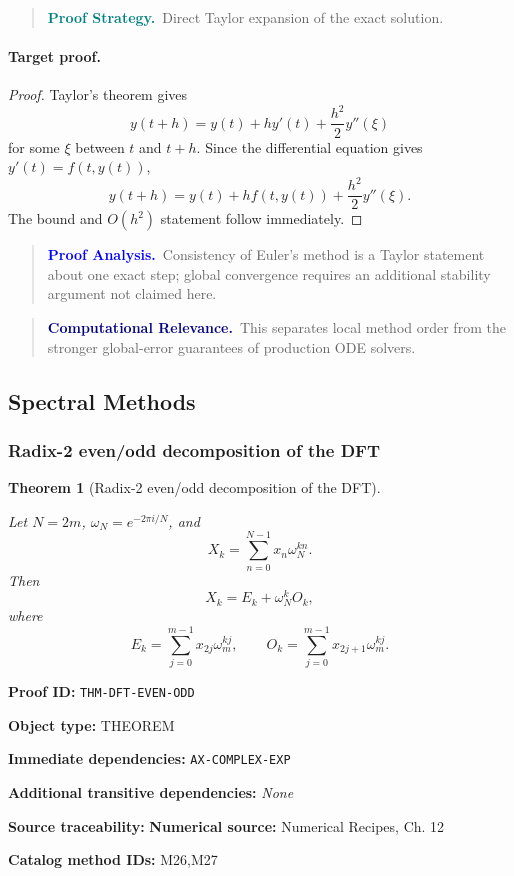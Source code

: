 \documentclass[10pt]{article}
\newcommand{\pidraw}[1]{\begingroup\urlstyle{tt}\nolinkurl{#1}\endgroup}
\newtheorem{theorem}{Theorem}[section]
\theoremstyle{definition}
\theoremstyle{remark}
\newenvironment{proofstrategy}
{\begin{quote}\small\noindent\textbf{\textcolor{teal}{Proof Strategy.}}\ }
{\end{quote}}
\newenvironment{proofanalysis}
{\begin{quote}\small\noindent\textbf{\textcolor{blue}{Proof Analysis.}}\ }
{\end{quote}}
\newenvironment{computationalrelevance}
{\begin{quote}\small\noindent\textbf{\textcolor{navy}{Computational Relevance.}}\ }
{\end{quote}}
\newcommand{\meta}[2]{\noindent\textbf{#1:} #2\par}
\begin{document}
\begin{proofstrategy}Direct Taylor expansion of the exact solution.\end{proofstrategy}

\paragraph{Target proof.}

\begin{proof}

Taylor's theorem gives
\[
y(t+h)=y(t)+hy'(t)+\frac{h^2}{2}y''(\xi)
\]
for some $\xi$ between $t$ and $t+h$. Since the differential equation gives
$y'(t)=f(t,y(t))$,
\[
y(t+h)=y(t)+h f(t,y(t))+\frac{h^2}{2}y''(\xi).
\]
The bound and $O(h^2)$ statement follow immediately.

\end{proof}

\begin{proofanalysis}Consistency of Euler's method is a Taylor statement about one exact step; global convergence requires an additional stability argument not claimed here.\end{proofanalysis}

\begin{computationalrelevance}This separates local method order from the stronger global-error guarantees of production ODE solvers.\end{computationalrelevance}

\subsection{Spectral Methods}

\subsubsection{Radix-2 even/odd decomposition of the DFT}

\begin{theorem}[Radix-2 even/odd decomposition of the DFT]\label{prf:THM-DFT-EVEN-ODD}

Let $N=2m$, $\omega_N=e^{-2\pi i/N}$, and
\[
X_k=\sum_{n=0}^{N-1}x_n\omega_N^{kn}.
\]
Then
\[
X_k=E_k+\omega_N^k O_k,
\]
where
\[
E_k=\sum_{j=0}^{m-1}x_{2j}\omega_m^{kj},
\qquad
O_k=\sum_{j=0}^{m-1}x_{2j+1}\omega_m^{kj}.
\]

\end{theorem}

\meta{Proof ID}{\pidraw{THM-DFT-EVEN-ODD}}
\meta{Object type}{THEOREM}
\meta{Immediate dependencies}{\pidraw{AX-COMPLEX-EXP}}
\meta{Additional transitive dependencies}{\emph{None}}
\meta{Source traceability}{\textbf{Numerical source:} Numerical Recipes, Ch. 12}
\meta{Catalog method IDs}{M26,M27}
\end{document}
